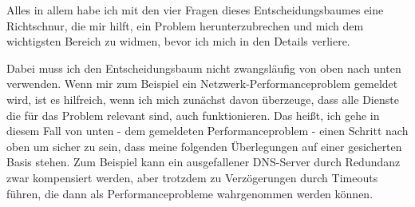 \begin{normaltext}
  Alles in allem habe ich mit den vier Fragen dieses Entscheidungsbaumes eine
  Richtschnur, die mir hilft, ein Problem herunterzubrechen und mich dem
  wichtigsten Bereich zu widmen, bevor ich mich in den Details verliere.

  Dabei muss ich den Entscheidungsbaum nicht zwangsläufig von oben nach unten
  verwenden. Wenn mir zum Beispiel ein Netzwerk-Performanceproblem gemeldet
  wird, ist es hilfreich, wenn ich mich zunächst davon überzeuge, dass alle
  Dienste die für das Problem relevant sind, auch funktionieren. Das heißt,
  ich gehe in diesem Fall von unten - dem gemeldeten Performanceproblem -
  einen Schritt nach oben um sicher zu sein, dass meine folgenden Überlegungen
  auf einer gesicherten Basis stehen. Zum Beispiel kann ein ausgefallener
  DNS-Server durch Redundanz zwar kompensiert werden, aber trotzdem zu
  Verzögerungen durch Timeouts führen, die dann als Performanceprobleme
  wahrgenommen werden können.
\end{normaltext}








